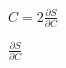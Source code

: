 \documentclass{article}
\begin{document}
$ C = 2 \frac{\partial S}{\partial C} $
\pagebreak

$ \frac{\partial S}{\partial C} $
\pagebreak
\end{document}
